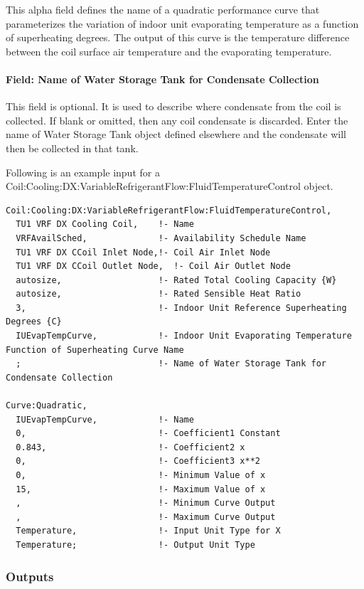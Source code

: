 This alpha field defines the name of a quadratic performance curve that parameterizes the variation of indoor unit evaporating temperature as a function of superheating degrees. The output of this curve is the temperature difference between the coil surface air temperature and the evaporating temperature.

\paragraph{Field: Name of Water Storage Tank for Condensate Collection}\label{field-name-of-water-storage-tank-for-condensate-collection-1}

This field is optional. It is used to describe where condensate from the coil is collected. If blank or omitted, then any coil condensate is discarded. Enter the name of Water Storage Tank object defined elsewhere and the condensate will then be collected in that tank.

Following is an example input for a Coil:Cooling:DX:VariableRefrigerantFlow:FluidTemperatureControl object.

\begin{lstlisting}
Coil:Cooling:DX:VariableRefrigerantFlow:FluidTemperatureControl,
  TU1 VRF DX Cooling Coil,    !- Name
  VRFAvailSched,              !- Availability Schedule Name
  TU1 VRF DX CCoil Inlet Node,!- Coil Air Inlet Node
  TU1 VRF DX CCoil Outlet Node,  !- Coil Air Outlet Node
  autosize,                   !- Rated Total Cooling Capacity {W}
  autosize,                   !- Rated Sensible Heat Ratio
  3,                          !- Indoor Unit Reference Superheating Degrees {C}
  IUEvapTempCurve,            !- Indoor Unit Evaporating Temperature Function of Superheating Curve Name
  ;                           !- Name of Water Storage Tank for Condensate Collection

Curve:Quadratic,
  IUEvapTempCurve,            !- Name
  0,                          !- Coefficient1 Constant
  0.843,                      !- Coefficient2 x
  0,                          !- Coefficient3 x**2
  0,                          !- Minimum Value of x
  15,                         !- Maximum Value of x
  ,                           !- Minimum Curve Output
  ,                           !- Maximum Curve Output
  Temperature,                !- Input Unit Type for X
  Temperature;                !- Output Unit Type
\end{lstlisting}

\subsubsection{Outputs}\label{outputs-7-003}

